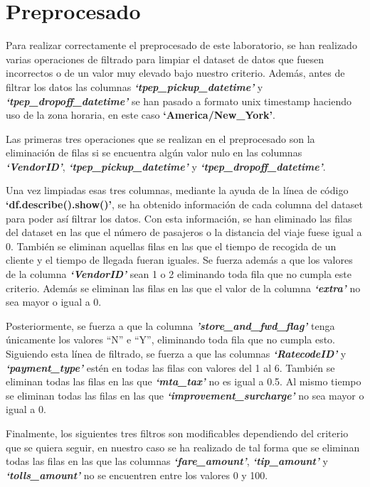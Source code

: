 \section{Preprocesado}

Para realizar correctamente el preprocesado de este laboratorio, se han realizado varias operaciones de filtrado para limpiar el dataset de datos que fuesen incorrectos o de un valor muy elevado bajo nuestro criterio. Además, antes de filtrar los datos las columnas \textbf{\textit{‘tpep_pickup_datetime’}} y \textbf{\textit{‘tpep_dropoff_datetime’}} se han pasado a formato unix timestamp haciendo uso de la zona horaria, en este caso \textbf{‘America/New_York’}.

Las primeras tres operaciones que se realizan en el preprocesado son la eliminación de filas si se encuentra algún valor nulo en las columnas \textbf{\textit{‘VendorID’}}, \textbf{\textit{‘tpep_pickup_datetime’}} y \textbf{\textit{‘tpep_dropoff_datetime’}}.

Una vez limpiadas esas tres columnas, mediante la ayuda de la línea de código \textbf{‘df.describe().show()’}, se ha obtenido información de cada columna del dataset para poder así filtrar los datos. Con esta información, se han eliminado las filas del dataset en las que el número de pasajeros o la distancia del viaje fuese igual a 0. También se eliminan aquellas filas en las que el tiempo de recogida de un cliente y el tiempo de llegada fueran iguales. Se fuerza además a que los valores de la columna \textbf{\textit{‘VendorID’}} sean 1 o 2 eliminando toda fila que no cumpla este criterio. Además se eliminan las filas en las que el valor de la columna \textbf{\textit{‘extra’}} no sea mayor o igual a 0.

Posteriormente, se fuerza a que la columna \textbf{\textit{'store_and_fwd_flag'}} tenga únicamente los valores “N” e “Y”, eliminando toda fila que no cumpla esto. Siguiendo esta línea de filtrado, se fuerza a que las columnas \textbf{\textit{‘RatecodeID’}} y \textbf{\textit{‘payment_type’}} estén en todas las filas con valores del 1 al 6. También se eliminan todas las filas en las que \textbf{\textit{‘mta_tax’}} no es igual a 0.5. Al mismo tiempo se eliminan todas las filas en las que \textbf{\textit{‘improvement_surcharge’}} no sea mayor o igual a 0.

Finalmente, los siguientes tres filtros son modificables dependiendo del criterio que se quiera seguir, en nuestro caso se ha realizado de tal forma que se eliminan todas las filas en las que las columnas \textbf{\textit{‘fare_amount’}}, \textbf{\textit{‘tip_amount’}} y \textbf{\textit{‘tolls_amount’}} no se encuentren entre los valores 0 y 100.
